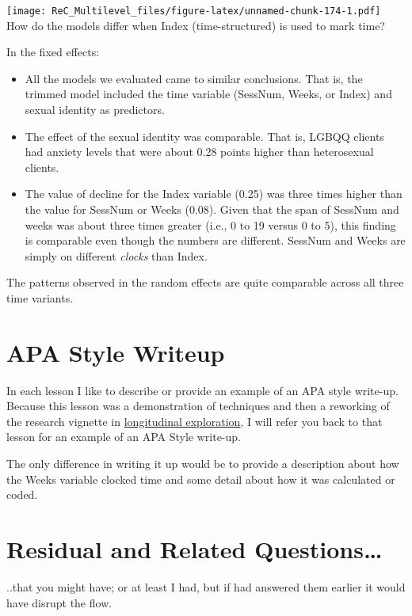 \documentclass[
  11pt,
]{book}
\providecommand{\tightlist}{%
  \setlength{\itemsep}{0pt}\setlength{\parskip}{0pt}}
\begin{document}
\texttt{[image: ReC\_Multilevel\_files/figure-latex/unnamed-chunk-174-1.pdf]}
How do the models differ when Index (time-structured) is used to mark time?

In the fixed effects:

\begin{itemize}
\tightlist
\item
  All the models we evaluated came to similar conclusions. That is, the trimmed model included the time variable (SessNum, Weeks, or Index) and sexual identity as predictors.
\item
  The effect of the sexual identity was comparable. That is, LGBQQ clients had anxiety levels that were about 0.28 points higher than heterosexual clients.
\item
  The value of decline for the Index variable (0.25) was three times higher than the value for SessNum or Weeks (0.08). Given that the span of SessNum and weeks was about three times greater (i.e., 0 to 19 versus 0 to 5), this finding is comparable even though the numbers are different. SessNum and Weeks are simply on different \emph{clocks} than Index.
\end{itemize}

The patterns observed in the random effects are quite comparable across all three time variants.

\hypertarget{apa-style-writeup-3}{%
\section{APA Style Writeup}\label{apa-style-writeup-3}}

In each lesson I like to describe or provide an example of an APA style write-up. Because this lesson was a demonstration of techniques and then a reworking of the research vignette in \href{MLMexplore}{longitudinal exploration}, I will refer you back to that lesson for an example of an APA Style write-up.

The only difference in writing it up would be to provide a description about how the Weeks variable clocked time and some detail about how it was calculated or coded.

\hypertarget{residual-and-related-questions-2}{%
\section{Residual and Related Questions\ldots{}}\label{residual-and-related-questions-2}}

..that you might have; or at least I had, but if had answered them earlier it would have disrupt the flow.
\end{document}
